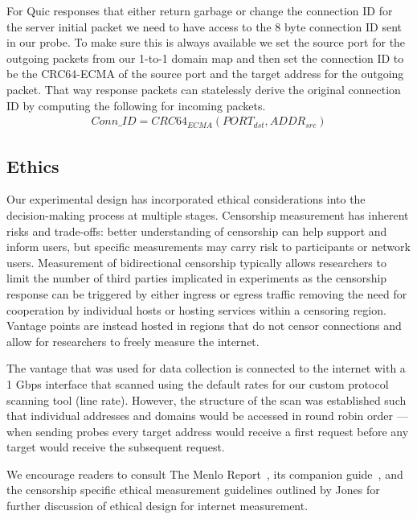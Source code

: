 For Quic responses that either return garbage or change the connection ID for
the server initial packet we need to have access to the 8 byte connection ID
sent in our probe. To make sure this is always available we set the source port
for the outgoing packets from our 1-to-1 domain map and then set the connection
ID to be the CRC64-ECMA of the source port and the target address for the
outgoing packet. That way response packets can statelessly derive the original
connection ID by computing the following for incoming packets.
\begin{gather*}
Conn\_ID = CRC64_{ECMA}(PORT_{dst},ADDR_{src})
\end{gather*}


\subsection{Ethics}\label{sec:methodology:ethics}

Our experimental design has incorporated ethical considerations into the
decision-making process at multiple stages. Censorship measurement has inherent
risks and trade-offs: better understanding of censorship can help support and
inform users, but specific measurements may carry risk to participants or
network users. Measurement of bidirectional censorship typically allows
researchers to limit the number of third parties implicated in experiments as
the censorship response can be triggered by either ingress or egress traffic
removing the need for cooperation by individual hosts or hosting services within
a censoring region. Vantage points are instead hosted in regions that do not
censor connections and allow for researchers to freely measure the internet.

The vantage that was used for data collection is connected to the internet with
a 1 Gbps interface that scanned using the default rates for our custom protocol
scanning tool (line rate). However, the structure of the scan was established
such that individual addresses and domains would be accessed in round robin
order --- \ie when sending probes every target address would receive a first
request before any target would receive the subsequent request.

We encourage readers to consult The Menlo Report~\cite{menlo}, its companion
guide~\cite{menlo-companion}, and the censorship specific ethical measurement
guidelines outlined by Jones \etal \cite{jones2015ethical} for further
discussion of ethical design for internet measurement.